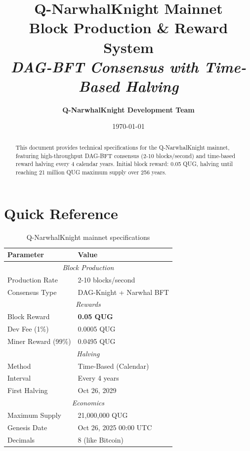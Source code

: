 \documentclass[11pt,a4paper]{article}
\title{
    \Huge\textbf{Q-NarwhalKnight Mainnet} \\
    \vspace{0.3cm}
    \Large Block Production \& Reward System \\
    \vspace{0.3cm}
    \large\textit{DAG-BFT Consensus with Time-Based Halving}
}
\author{\textbf{Q-NarwhalKnight Development Team}}
\date{\today}
\begin{document}
\maketitle

\begin{abstract}
This document provides technical specifications for the Q-NarwhalKnight mainnet, featuring high-throughput DAG-BFT consensus (2-10 blocks/second) and time-based reward halving every 4 calendar years. Initial block reward: 0.05 QUG, halving until reaching 21 million QUG maximum supply over 256 years.
\end{abstract}

\tableofcontents
\newpage

\section{Quick Reference}

\begin{table}[h]
\centering
\begin{tabular}{ll}
\toprule
\textbf{Parameter} & \textbf{Value} \\
\midrule
\multicolumn{2}{c}{\textit{Block Production}} \\
\midrule
Production Rate & 2-10 blocks/second \\
Consensus Type & DAG-Knight + Narwhal BFT \\
\midrule
\multicolumn{2}{c}{\textit{Rewards}} \\
\midrule
Block Reward & \textbf{0.05 QUG} \\
Dev Fee (1\%) & 0.0005 QUG \\
Miner Reward (99\%) & 0.0495 QUG \\
\midrule
\multicolumn{2}{c}{\textit{Halving}} \\
\midrule
Method & Time-Based (Calendar) \\
Interval & Every 4 years \\
First Halving & Oct 26, 2029 \\
\midrule
\multicolumn{2}{c}{\textit{Economics}} \\
\midrule
Maximum Supply & 21,000,000 QUG \\
Genesis Date & Oct 26, 2025 00:00 UTC \\
Decimals & 8 (like Bitcoin) \\
\bottomrule
\end{tabular}
\caption{Q-NarwhalKnight mainnet specifications}
\end{table}
\end{document}
